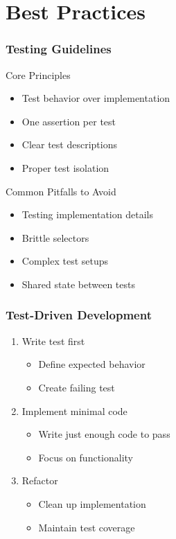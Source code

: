 \documentclass{beamer}
\begin{document}
\section{Best Practices}
\begin{frame}
    \frametitle{Testing Guidelines}
    \begin{block}{Core Principles}
        \begin{itemize}
            \item Test behavior over implementation
            \item One assertion per test
            \item Clear test descriptions
            \item Proper test isolation
        \end{itemize}
    \end{block}
    
    \begin{alertblock}{Common Pitfalls to Avoid}
        \begin{itemize}
            \item Testing implementation details
            \item Brittle selectors
            \item Complex test setups
            \item Shared state between tests
        \end{itemize}
    \end{alertblock}
\end{frame}

\begin{frame}
    \frametitle{Test-Driven Development}
    \begin{enumerate}
        \item Write test first
        \begin{itemize}
            \item Define expected behavior
            \item Create failing test
        \end{itemize}
        \pause
        \item Implement minimal code
        \begin{itemize}
            \item Write just enough code to pass
            \item Focus on functionality
        \end{itemize}
        \pause
        \item Refactor
        \begin{itemize}
            \item Clean up implementation
            \item Maintain test coverage
        \end{itemize}
    \end{enumerate}
\end{frame}
\end{document}
